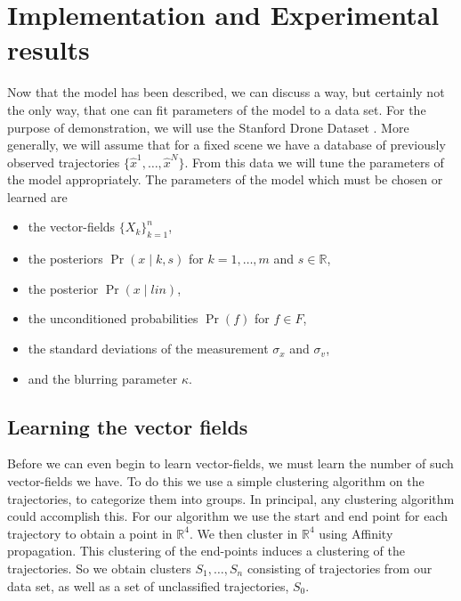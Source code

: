 \documentclass[conference]{IEEEtran}
\begin{document}
\section{Implementation and Experimental results}
  Now that the model has been described, we can discuss a way, but certainly not the only way, that one can fit parameters of the model to a data set.
  For the purpose of demonstration, we will use the Stanford Drone Dataset \cite{StanfordDroneData}.
  More generally, we will assume that for a fixed scene we have a database of previously observed trajectories $\{ \hat{x}^1, \dots, \hat{x}^N\}$.
  From this data we will tune the parameters of the model appropriately.
  The parameters of the model which must be chosen or learned are
  \begin{itemize}
  	\item the vector-fields $\{ X_k\}_{k=1}^{n}$,
	\item the posteriors $\Pr(x \mid k,s)$ for $k=1,\dots,m$ and $s \in \mathbb{R}$,
	\item the posterior $\Pr(x \mid lin)$,
	\item the unconditioned probabilities $\Pr(f)$ for $f \in F$,
	\item the standard deviations of the measurement $\sigma_x$ and $\sigma_v$,
	\item and the blurring parameter $\kappa$.
  \end{itemize}
  
  \subsection{Learning the vector fields}
  Before we can even begin to learn vector-fields, we must learn the number of such vector-fields we have.
  To do this we use a simple clustering algorithm on the trajectories, to categorize them into groups.
  In principal, any clustering algorithm could accomplish this.
  For our algorithm we use the start and end point for each trajectory to obtain a point in $\mathbb{R}^4$.
  We then cluster in $\mathbb{R}^4$ using Affinity propagation.
  This clustering of the end-points induces a clustering of the trajectories.
  So we obtain clusters $S_1, \dots, S_n$ consisting of trajectories from our data set, as well as a set of unclassified trajectories, $S_0$.
  
\end{document}
